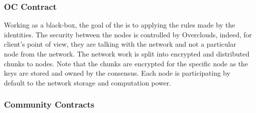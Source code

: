 \subsubsection{OC Contract} Working as a black-box, the goal of the is to applying the rules made by the identities. The security between the nodes is controlled by Overclouds, indeed, for client's point of view, they are talking with the network and not a particular node from the network. The network work is split into encrypted and distributed chunks to nodes. Note that the chunks are encrypted for the specific node as the keys are stored and owned by the consensus. Each node is participating by default to the network storage and computation power.

\subsubsection{Community Contracts} 



